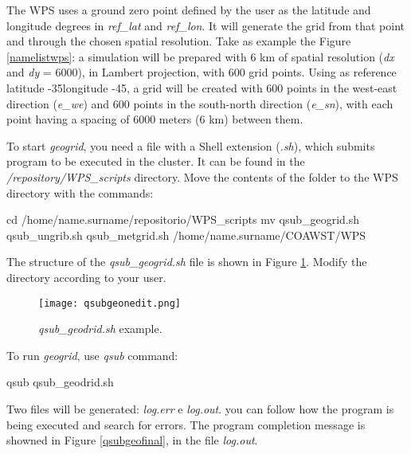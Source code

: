 \bigskip

\noindent The WPS uses a ground zero point defined by the user as the latitude and longitude degrees in \textit{ref\_lat} and \textit{ref\_lon}.
It will generate the grid from that point and through the chosen spatial resolution. Take as example the Figure
\textcolor{bleu_cite}{\ref{namelistwps}}: a simulation will be prepared with 6 km of spatial resolution (\textit{dx} and \textit{dy} = 6000),
in Lambert projection, with 600 grid points. Using as reference latitude -35\degree longitude -45\degree, a grid will be created with 
600 points in the west-east direction (\textit{e\_we}) and 600 points in the south-north direction (\textit{e\_sn}), with each
point having a spacing of 6000 meters (6 km) between them.
\bigskip

\noindent To start \textit{geogrid}, you need a file with a Shell extension (\textit{.sh}), which submits program to be executed in the cluster.
 It can be found in the \textit{/repository/WPS\_scripts} directory. Move the contents of the folder to the WPS directory with the commands:
\bigskip

\begin{bashcode}[fontsize=\footnotesize]
cd /home/name.surname/repositorio/WPS_scripts
mv qsub_geogrid.sh qsub_ungrib.sh qsub_metgrid.sh /home/name.surname/COAWST/WPS
\end{bashcode}
\bigskip

\noindent The structure of the \textit{qsub\_geogrid.sh} file is shown in Figure \textcolor{bleu_cite}{\ref{qsubgeonedit}}. 
Modify the directory according to your user.
\bigskip

\begin{figure}[H]
    \centering
    \texttt{[image: qsubgeonedit.png]}
    \caption{\textit{qsub\_geodrid.sh} example.}
    \label{qsubgeonedit}
\end{figure}
\bigskip

\noindent To run \textit{geogrid}, use \textit{qsub} command:
\bigskip

\begin{bashcode}
qsub qsub_geodrid.sh
\end{bashcode}
\bigskip

\noindent Two files will be generated: \textit{log.err} e \textit{log.out}. you can follow how the program is being executed and search for errors. 
The program completion message is showned in Figure \textcolor{bleu_cite}{\ref{qsubgeofinal}}, in the file \textit{log.out}.

